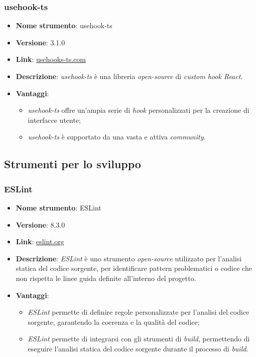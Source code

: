 \subsubsection{usehook-ts}
\begin{itemize}
      \item \textbf{Nome strumento}: usehook-ts
      \item \textbf{Versione}: 3.1.0
      \item \textbf{Link}: \href{https://usehooks-ts.com/}{usehooks-ts.com}
      \item \textbf{Descrizione}: \textit{usehook-ts} è una libreria \textit{open-source} di \textit{custom hook React}.
      \item \textbf{Vantaggi}:
            \begin{itemize}
                  \item \textit{usehook-ts} offre un'ampia serie di \textit{hook} personalizzati per la creazione di interfacce utente;
                  \item \textit{usehook-ts} è supportato da una vasta e attiva \textit{community}.
            \end{itemize}
\end{itemize}

\subsection{Strumenti per lo sviluppo}

\subsubsection{ESLint}
\begin{itemize}
      \item \textbf{Nome strumento}: ESLint
      \item \textbf{Versione}: 8.3.0
      \item \textbf{Link}: \href{https://eslint.org/}{eslint.org}
      \item \textbf{Descrizione}: \textit{ESLint} è uno strumento \textit{open-source} utilizzato per l'analisi statica del codice sorgente, per identificare pattern problematici o codice che non rispetta
            le linee guida definite all'interno del progetto.
      \item \textbf{Vantaggi}:
            \begin{itemize}
                  \item \textit{ESLint} permette di definire regole personalizzate per l'analisi del codice sorgente, garantendo la coerenza e la qualità del codice;
                  \item \textit{ESLint} permette di integrarsi con gli strumenti di \textit{build}, permettendo di eseguire l'analisi statica del codice sorgente durante il processo di \textit{build}.
            \end{itemize}
\end{itemize}

